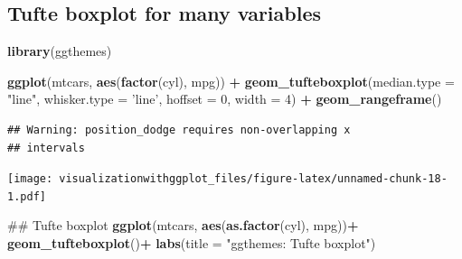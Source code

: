 \documentclass[]{krantz}
\makeatletter
\newenvironment{Shaded}{\begin{snugshade}}{\end{snugshade}}
\newcommand{\KeywordTok}[1]{\textcolor[rgb]{0.13,0.29,0.53}{\textbf{#1}}}
\newcommand{\DataTypeTok}[1]{\textcolor[rgb]{0.13,0.29,0.53}{#1}}
\newcommand{\DecValTok}[1]{\textcolor[rgb]{0.00,0.00,0.81}{#1}}
\newcommand{\StringTok}[1]{\textcolor[rgb]{0.31,0.60,0.02}{#1}}
\newcommand{\OperatorTok}[1]{\textcolor[rgb]{0.81,0.36,0.00}{\textbf{#1}}}
\newcommand{\NormalTok}[1]{#1}
\newenvironment{kframe}{%
\medskip{}
\setlength{\fboxsep}{.8em}
 \def\at@end@of@kframe{}%
 \ifinner\ifhmode%
  \def\at@end@of@kframe{\end{minipage}}%
  \begin{minipage}{\columnwidth}%
 \fi\fi%
 \def\FrameCommand##1{\hskip\@totalleftmargin \hskip-\fboxsep
 \colorbox{shadecolor}{##1}\hskip-\fboxsep
     \hskip-\linewidth \hskip-\@totalleftmargin \hskip\columnwidth}%
 \MakeFramed {\advance\hsize-\width
   \@totalleftmargin\z@ \linewidth\hsize
   \@setminipage}}%
 {\par\unskip\endMakeFramed%
 \at@end@of@kframe}
\renewenvironment{Shaded}{\begin{kframe}}{\end{kframe}}
\theoremstyle{definition}
\theoremstyle{definition}
\theoremstyle{definition}
\theoremstyle{remark}
\makeatother
\begin{document}
\begin{Shaded}
\end{Shaded}

\subsection{Tufte boxplot for many
variables}\label{tufte-boxplot-for-many-variables}

\begin{Shaded}
\begin{Highlighting}[]
\KeywordTok{library}\NormalTok{(ggthemes)}

\KeywordTok{ggplot}\NormalTok{(mtcars, }\KeywordTok{aes}\NormalTok{(}\KeywordTok{factor}\NormalTok{(cyl), mpg)) }\OperatorTok{+}
\StringTok{  }\KeywordTok{geom_tufteboxplot}\NormalTok{(}\DataTypeTok{median.type =} \StringTok{"line"}\NormalTok{, }\DataTypeTok{whisker.type =} \StringTok{'line'}\NormalTok{, }\DataTypeTok{hoffset =} \DecValTok{0}\NormalTok{, }\DataTypeTok{width =} \DecValTok{4}\NormalTok{) }\OperatorTok{+}
\StringTok{  }\KeywordTok{geom_rangeframe}\NormalTok{() }
\end{Highlighting}
\end{Shaded}

\begin{verbatim}
## Warning: position_dodge requires non-overlapping x
## intervals
\end{verbatim}

\texttt{[image: visualizationwithggplot\_files/figure-latex/unnamed-chunk-18-1.pdf]}

\begin{Shaded}
\begin{Highlighting}[]
\NormalTok{## Tufte boxplot}
\KeywordTok{ggplot}\NormalTok{(mtcars, }\KeywordTok{aes}\NormalTok{(}\KeywordTok{as.factor}\NormalTok{(cyl), mpg))}\OperatorTok{+}
\StringTok{  }\KeywordTok{geom_tufteboxplot}\NormalTok{()}\OperatorTok{+}
\StringTok{  }\KeywordTok{labs}\NormalTok{(}\DataTypeTok{title =} \StringTok{"ggthemes: Tufte boxplot"}\NormalTok{)}
\end{Highlighting}
\end{Shaded}
\end{document}
